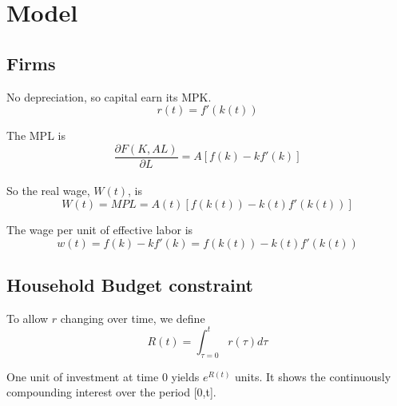 \documentclass[12pt]{article}
\begin{document}
\section{Model}
\subsection{Firms}

No depreciation, so capital earn its MPK.
\begin{equation*}
r(t) = f'(k(t))
\end{equation*}

The MPL is 
\begin{equation*}
		\frac{\partial F(K, AL) }{\partial L } = A[f(k) - kf'(k)]
\end{equation*}
\noindent{}\\



So the real wage, $ W(t) $, is 
\begin{equation*}
		W(t) = MPL = A(t)[f(k(t)) - k(t)f'(k(t))]
\end{equation*}

The wage per unit of effective labor is
\begin{equation*}
w(t) =f(k) - kf'(k) =  f(k(t)) - k(t)f'(k(t))
\end{equation*}


\subsection{Household Budget constraint}



To allow $ r $ changing over time, we define 
\begin{equation*}
R(t) = \int_{\tau = 0}^{t} r(\tau)d \tau
\end{equation*}

One unit of investment at time 0 yields $ e^{R(t)} $ units. It shows the continuously
compounding interest over the period [0,t].
\end{document}
